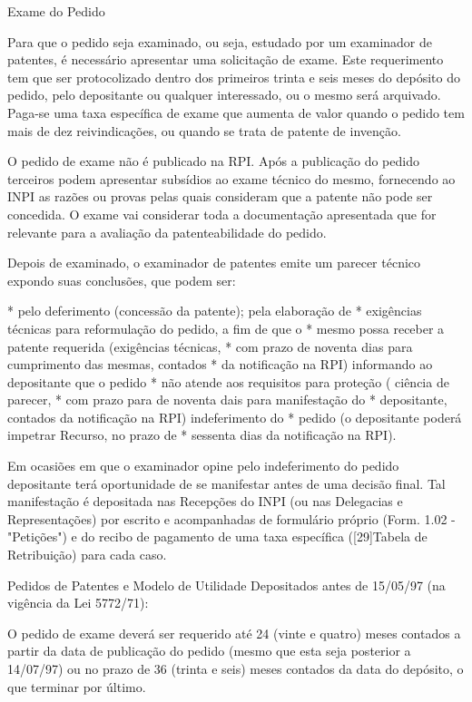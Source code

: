\documentclass[12pt]{article}
\begin{document}
 Exame do Pedido
 
 Para que o pedido seja examinado, ou seja, estudado por um examinador
 de patentes, é necessário apresentar uma solicitação de exame. Este
 requerimento tem que ser protocolizado dentro dos primeiros trinta e
 seis meses do depósito do pedido, pelo depositante ou qualquer
 interessado, ou o mesmo será arquivado. Paga-se uma taxa específica
 de exame que aumenta de valor quando o pedido tem mais de dez
 reivindicações, ou quando se trata de patente de invenção.
 
 O pedido de exame não é publicado na RPI. Após a publicação do pedido
 terceiros podem apresentar subsídios ao exame técnico do mesmo,
 fornecendo ao INPI as razões ou provas pelas quais consideram que a
 patente não pode ser concedida. O exame vai considerar toda a
 documentação apresentada que for relevante para a avaliação da
 patenteabilidade do pedido.
 
 Depois de examinado, o examinador de patentes emite um parecer
 técnico expondo suas conclusões, que podem ser:

     * pelo deferimento (concessão da patente); pela elaboração de
     * exigências técnicas para reformulação do pedido, a fim de que o
     * mesmo possa receber a patente requerida (exigências técnicas,
     * com prazo de noventa dias para cumprimento das mesmas, contados
     * da notificação na RPI) informando ao depositante que o pedido
     * não atende aos requisitos para proteção ( ciência de parecer,
     * com prazo para de noventa dais para manifestação do
     * depositante, contados da notificação na RPI) indeferimento do
     * pedido (o depositante poderá impetrar Recurso, no prazo de
     * sessenta dias da notificação na RPI).
     
     Em ocasiões em que o examinador opine pelo indeferimento do
     pedido depositante terá oportunidade de se manifestar antes de
     uma decisão final. Tal manifestação é depositada nas Recepções do
     INPI (ou nas Delegacias e Representações) por escrito e
     acompanhadas de formulário próprio (Form. 1.02 - "Petições") e do
     recibo de pagamento de uma taxa específica ([29]Tabela de
     Retribuição) para cada caso.
     
     Pedidos de Patentes e Modelo de Utilidade Depositados antes de
     15/05/97 (na vigência da Lei 5772/71):
     
     O pedido de exame deverá ser requerido até 24 (vinte e quatro)
     meses contados a partir da data de publicação do pedido (mesmo
     que esta seja posterior a 14/07/97) ou no prazo de 36 (trinta e
     seis) meses contados da data do depósito, o que terminar por
     último.
\end{document}
